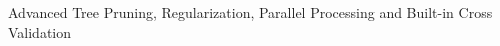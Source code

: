 \documentclass[preview]{standalone}
\begin{document}
\begin{center}
Advanced Tree Pruning, Regularization, Parallel Processing and Built-in Cross Validation
\end{center}
\end{document}
